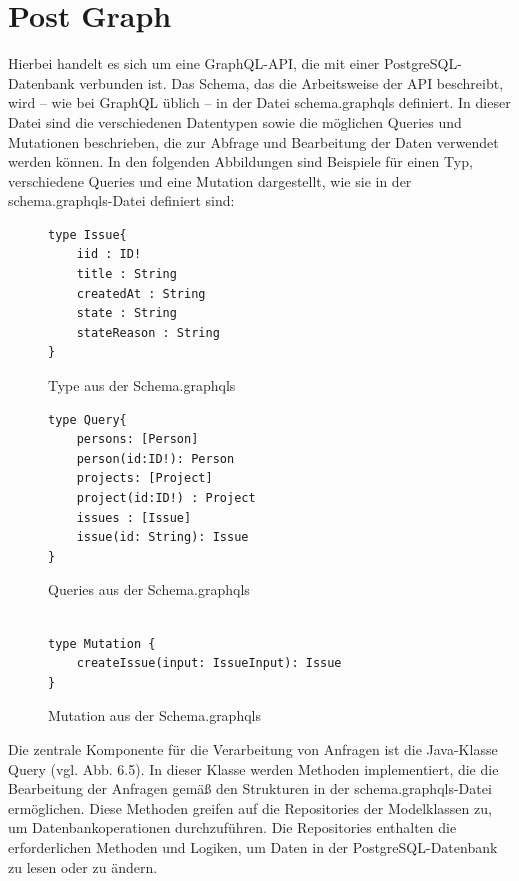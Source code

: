 \section{Post Graph} %
\label{sec:postgraph}
Hierbei handelt es sich um eine GraphQL-API, die mit einer PostgreSQL-Datenbank verbunden ist. Das Schema, das die Arbeitsweise der API beschreibt, wird – wie bei GraphQL üblich – in der Datei schema.graphqls definiert. In dieser Datei sind die verschiedenen Datentypen sowie die möglichen Queries und Mutationen beschrieben, die zur Abfrage und Bearbeitung der Daten verwendet werden können. 
\noindent
In den folgenden Abbildungen sind Beispiele für einen Typ, verschiedene Queries und eine Mutation dargestellt, wie sie in der schema.graphqls-Datei definiert sind:
\begin{figure}[H]
\begin{center}
\begin{BVerbatim}
type Issue{
    iid : ID!
    title : String
    createdAt : String
    state : String
    stateReason : String
}
\end{BVerbatim}
\end{center}
\caption{Type aus der Schema.graphqls}
\end{figure}
\begin{figure}[H]
\begin{center}
\begin{BVerbatim}
type Query{
    persons: [Person]
    person(id:ID!): Person
    projects: [Project]
    project(id:ID!) : Project
    issues : [Issue]
    issue(id: String): Issue
}
\end{BVerbatim}
\end{center}
\caption{Queries aus der Schema.graphqls}
\end{figure}
\begin{figure}[H]
\begin{center}
\begin{BVerbatim}

type Mutation {
    createIssue(input: IssueInput): Issue
}
\end{BVerbatim}
\end{center}
\caption{Mutation aus der Schema.graphqls}
\end{figure}
\newpage
\noindent
Die zentrale Komponente für die Verarbeitung von Anfragen ist die Java-Klasse Query (vgl. Abb. 6.5). In dieser Klasse werden Methoden implementiert, die die Bearbeitung der Anfragen gemäß den Strukturen in der schema.graphqls-Datei ermöglichen. Diese Methoden greifen auf die Repositories der Modelklassen zu, um Datenbankoperationen durchzuführen. Die Repositories enthalten die erforderlichen Methoden und Logiken, um Daten in der PostgreSQL-Datenbank zu lesen oder zu ändern.
